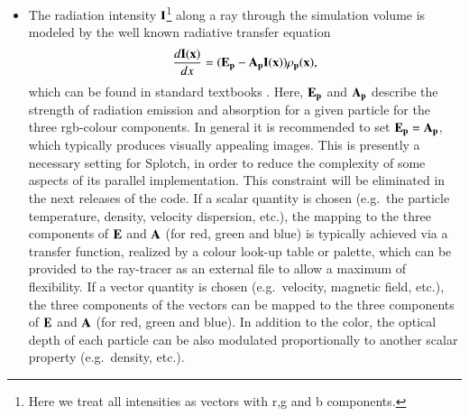 \documentclass[1p,times]{elsarticle}
\begin{document}
\begin{itemize}
\item
The radiation intensity $\bf{I}$\footnote{Here we treat all
intensities as vectors with r,g and b components.} along a ray through the simulation
volume is modeled by the well known radiative transfer equation
\begin{equation}
\frac{d\bf{I}(x)}{dx}=(\bf{E}_p-\bf{A}_p\bf{I}(x))\rho_p(x),
\end{equation}
which can be found in standard textbooks \cite{1991par..book.....S}.
Here, $\bf{E}_p$ and $\bf{A}_p$ describe the strength of radiation emission and absorption
for a given particle for the three rgb-colour components. In general it is recommended to
set $\bf{E}_p=\bf{A}_p$, which typically produces visually appealing images. This is presently a 
necessary setting for Splotch, in order to reduce the complexity of some aspects of its parallel
implementation. This constraint will be eliminated in the next releases of the code.
If a scalar quantity is chosen (e.g.\ the particle temperature,
density, velocity dispersion, etc.), the mapping to the three components of $\bf{E}$ and $\bf{A}$ (for red, green and blue)
is typically achieved via a transfer function, realized by a colour look-up table or palette, which can
be provided to the ray-tracer as an external file to allow a maximum of flexibility. If a
vector quantity is chosen (e.g.\ velocity, magnetic field, etc.), the three components of the vectors
can be mapped to the three components of $\bf{E}$ and $\bf{A}$ (for red, green and blue). In addition 
to the color, the optical depth of each particle can be also modulated proportionally to another
scalar property (e.g.\ density, etc.).
\end{itemize}


%
\end{document}
